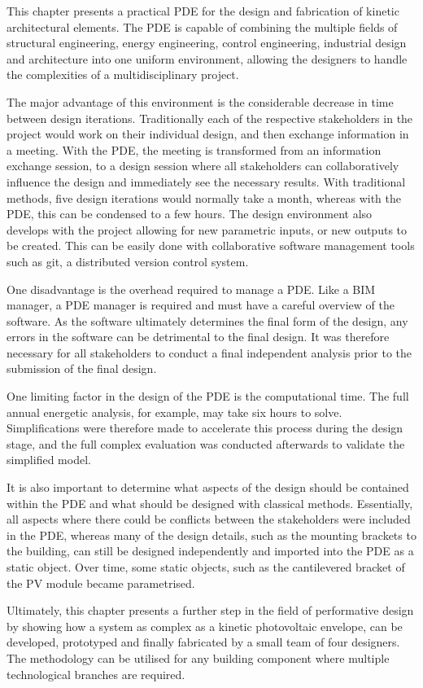 
This chapter presents a practical PDE for the design and fabrication of kinetic architectural elements. The PDE is capable of combining the multiple fields of structural engineering, energy engineering, control engineering, industrial design and architecture into one uniform environment, allowing the designers to handle the complexities of a multidisciplinary project. 

The major advantage of this environment is the considerable decrease in time between design iterations. Traditionally each of the respective stakeholders in the project would work on their individual design, and then exchange information in a meeting. With the PDE, the meeting is transformed from an information exchange session, to a design session where all stakeholders can collaboratively influence the design and immediately see the necessary results.  With traditional methods, five design iterations would normally take a month, whereas with the PDE, this can be condensed to a few hours. The design environment also develops with the project allowing for new parametric inputs, or new outputs to be created. This can be easily done with collaborative software management tools such as git, a distributed version control system.

One disadvantage is the overhead required to manage a PDE. Like a BIM manager, a PDE manager is required and must have a careful overview of the software. As the software ultimately determines the final form of the design, any errors in the software can be detrimental to the final design. It was therefore necessary for all stakeholders to conduct a final independent analysis prior to the submission of the final design. 

One limiting factor in the design of the PDE is the computational time. The full annual energetic analysis, for example, may take six hours to solve. Simplifications were therefore made to accelerate this process during the design stage, and the full complex evaluation was conducted afterwards to validate the simplified model.

It is also important to determine what aspects of the design should be contained within the PDE and what should be designed with classical methods. Essentially, all aspects where there could be conflicts between the stakeholders were included in the PDE, whereas many of the design details, such as the mounting brackets to the building, can still be designed independently and imported into the PDE as a static object. Over time, some static objects, such as the cantilevered bracket of the PV module became parametrised. 

Ultimately, this chapter presents a further step in the field of performative design by showing how a system as complex as a kinetic photovoltaic envelope, can be developed, prototyped and finally fabricated by a small team of four designers. The methodology can be utilised for any building component where multiple technological branches are required.

